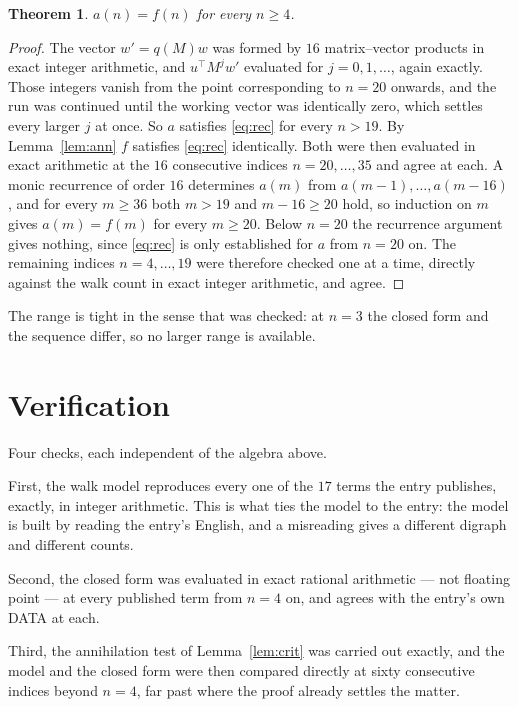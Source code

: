 \documentclass[11pt,a4paper]{article}
\theoremstyle{plain}
\newtheorem{theorem}{Theorem}
\theoremstyle{definition}
\begin{document}
\begin{theorem}
$a(n)=f(n)$ for every $n\ge4$.
\end{theorem}

\begin{proof}
The vector $w'=q(M)w$ was formed by $16$ matrix--vector products in exact integer
arithmetic, and $u^{\!\top}M^{j}w'$ evaluated for $j=0,1,\dots$, again exactly. Those integers
vanish from the point corresponding to $n=20$ onwards, and the run was continued until the
working vector was identically zero, which settles every larger $j$ at once. So $a$ satisfies
\eqref{eq:rec} for every $n>19$. By Lemma~\ref{lem:ann} $f$ satisfies \eqref{eq:rec}
identically. Both were then evaluated in exact arithmetic at the $16$ consecutive indices
$n=20,\dots,35$ and agree at each. A monic recurrence of order $16$
determines $a(m)$ from $a(m-1),\dots,a(m-16)$, and for every $m\ge36$ both
$m>19$ and $m-16\ge20$ hold, so induction on $m$ gives $a(m)=f(m)$ for every
$m\ge20$.
Below $n=20$ the recurrence argument gives nothing, since \eqref{eq:rec} is only
established for $a$ from $n=20$ on. The remaining indices $n=4,\dots,19$ were
therefore checked one at a time, directly against the walk count in exact integer arithmetic,
and agree.
\end{proof}

The range is tight in the sense that was checked: at $n=3$ the closed form and the sequence differ, so no larger range is available.

\section{Verification}

Four checks, each independent of the algebra above.

First, the walk model reproduces every one of the $17$ terms the entry publishes,
exactly, in integer arithmetic. This is what ties the model to the entry: the model is built
by reading the entry's English, and a misreading gives a different digraph and different
counts.

Second, the closed form was evaluated in exact rational arithmetic --- not floating point ---
at every published term from $n=4$ on, and agrees with the entry's own DATA at each.

Third, the annihilation test of Lemma~\ref{lem:crit} was carried out exactly, and the model
and the closed form were then compared directly at sixty consecutive indices beyond
$n=4$, far past where the proof already settles the matter.
\end{document}
